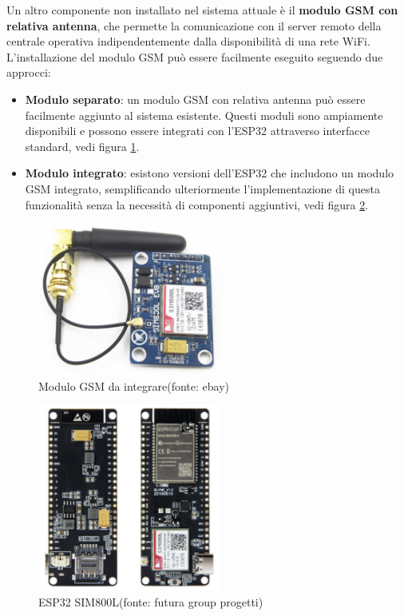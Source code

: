 \documentclass[12pt, a4paper, italian]{report}
\numberwithin{figure}{chapter}
\numberwithin{table}{chapter}
\begin{document}
Un altro componente non installato nel sistema attuale è il \textbf{modulo GSM con relativa antenna}, che permette la comunicazione con il server remoto della centrale operativa indipendentemente dalla disponibilità di una rete WiFi.
L'installazione del modulo GSM può essere facilmente eseguito seguendo due approcci: 

\begin{itemize}
    \item \textbf{Modulo separato}: un modulo GSM con relativa antenna può essere facilmente aggiunto al sistema esistente. Questi moduli sono ampiamente disponibili e possono essere integrati con l'ESP32 attraverso interfacce standard, vedi figura  \ref{fig:modulo_gsm}.
    \item \textbf{Modulo integrato}: esistono versioni dell'ESP32 che includono un modulo GSM integrato, semplificando ulteriormente l'implementazione di questa funzionalità senza la necessità di componenti aggiuntivi, vedi figura \ref{fig:esp32_gsm}.
\end{itemize}

\begin{figure}[h]
  \centering
  \includegraphics[width=6cm]{gsm_module.png}
  \caption{Modulo GSM da integrare\protect\footnotemark (fonte: ebay)}
  \label{fig:modulo_gsm}
\end{figure}

\begin{figure}[h]
  \centering
  \includegraphics[width=6cm]{esp32_gsm.png}
  \caption{ESP32 SIM800L\protect\footnotemark (fonte: futura group progetti)}
  \label{fig:esp32_gsm}
\end{figure}
\end{document}
